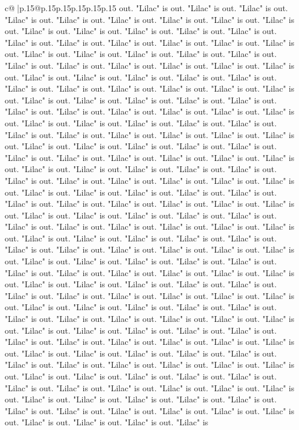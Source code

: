 \documentclass{article}
\begin{document}
{\begin{supertabular}{c@{$\;$}|p{.15\linewidth}@{}p{.15\linewidth}p{.15\linewidth}p{.15\linewidth}p{.15\linewidth}p{.15\linewidth}}
{{{out. "Lilac" is out. "Lilac" is out. "Lilac" is out. "Lilac" is out. "Lilac" is out. "Lilac" is out. "Lilac" is out. "Lilac" is out. "Lilac" is out. "Lilac" is out. "Lilac" is out. "Lilac" is out. "Lilac" is out. "Lilac" is out. "Lilac" is out. "Lilac" is out. "Lilac" is out. "Lilac" is out. "Lilac" is out. "Lilac" is out. "Lilac" is out. "Lilac" is out. "Lilac" is out. "Lilac" is out. "Lilac" is out. "Lilac" is out. "Lilac" is out. "Lilac" is out. "Lilac" is out. "Lilac" is out. "Lilac" is out. "Lilac" is out. "Lilac" is out. "Lilac" is out. "Lilac" is out. "Lilac" is out. "Lilac" is out. "Lilac" is out. "Lilac" is out. "Lilac" is out. "Lilac" is out. "Lilac" is out. "Lilac" is out. "Lilac" is out. "Lilac" is out. "Lilac" is out. "Lilac" is out. "Lilac" is out. "Lilac" is out. "Lilac" is out. "Lilac" is out. "Lilac" is out. "Lilac" is out. "Lilac" is out. "Lilac" is out. "Lilac" is out. "Lilac" is out. "Lilac" is out. "Lilac" is out. "Lilac" is out. "Lilac" is out. "Lilac" is out. "Lilac" is out. "Lilac" is out. "Lilac" is out. "Lilac" is out. "Lilac" is out. "Lilac" is out. "Lilac" is out. "Lilac" is out. "Lilac" is out. "Lilac" is out. "Lilac" is out. "Lilac" is out. "Lilac" is out. "Lilac" is out. "Lilac" is out. "Lilac" is out. "Lilac" is out. "Lilac" is out. "Lilac" is out. "Lilac" is out. "Lilac" is out. "Lilac" is out. "Lilac" is out. "Lilac" is out. "Lilac" is out. "Lilac" is out. "Lilac" is out. "Lilac" is out. "Lilac" is out. "Lilac" is out. "Lilac" is out. "Lilac" is out. "Lilac" is out. "Lilac" is out. "Lilac" is out. "Lilac" is out. "Lilac" is out. "Lilac" is out. "Lilac" is out. "Lilac" is out. "Lilac" is out. "Lilac" is out. "Lilac" is out. "Lilac" is out. "Lilac" is out. "Lilac" is out. "Lilac" is out. "Lilac" is out. "Lilac" is out. "Lilac" is out. "Lilac" is out. "Lilac" is out. "Lilac" is out. "Lilac" is out. "Lilac" is out. "Lilac" is out. "Lilac" is out. "Lilac" is out. "Lilac" is out. "Lilac" is out. "Lilac" is out. "Lilac" is out. "Lilac" is out. "Lilac" is out. "Lilac" is out. "Lilac" is out. "Lilac" is out. "Lilac" is out. "Lilac" is out. "Lilac" is out. "Lilac" is out. "Lilac" is out. "Lilac" is out. "Lilac" is out. "Lilac" is out. "Lilac" is out. "Lilac" is out. "Lilac" is out. "Lilac" is out. "Lilac" is out. "Lilac" is out. "Lilac" is out. "Lilac" is out. "Lilac" is out. "Lilac" is out. "Lilac" is out. "Lilac" is out. "Lilac" is out. "Lilac" is out. "Lilac" is out. "Lilac" is out. "Lilac" is out. "Lilac" is out. "Lilac" is out. "Lilac" is out. "Lilac" is out. "Lilac" is out. "Lilac" is out. "Lilac" is out. "Lilac" is out. "Lilac" is out. "Lilac" is out. "Lilac" is out. "Lilac" is out. "Lilac" is out. "Lilac" is out. "Lilac" is out. "Lilac" is out. "Lilac" is out. "Lilac" is out. "Lilac" is out. "Lilac" is out. "Lilac" is out. "Lilac" is out. "Lilac" is out. "Lilac" is out. "Lilac" is out. "Lilac" is out. "Lilac" is out. "Lilac" is out. "Lilac" is out. "Lilac" is out. "Lilac" is out. "Lilac" is out. "Lilac" is out. "Lilac" is out. "Lilac" is out. "Lilac" is out. "Lilac" is out. "Lilac" is out. "Lilac" is out. "Lilac" is out. "Lilac" is out. "Lilac" is out. "Lilac" is out. "Lilac" is out. "Lilac" is out. "Lilac" is }}}
\end{supertabular}}
\end{document}
